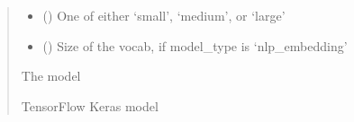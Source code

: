 \documentclass[letterpaper,10pt,english]{sphinxmanual}
\begin{document}
\begin{fulllineitems}
\begin{quote}
\begin{description}
\begin{itemize}
\item {} 
\sphinxAtStartPar
{} (\sphinxstyleliteralemphasis{\sphinxupquote{ (}}\sphinxstyleliteralemphasis{\sphinxupquote{)}}) \textendash{} One of either ‘small’, ‘medium’, or ‘large’

\item {} 
\sphinxAtStartPar
{} (\sphinxstyleliteralemphasis{\sphinxupquote{ (}}\sphinxstyleliteralemphasis{\sphinxupquote{)}}) \textendash{} Size of the vocab, if model\_type is ‘nlp\_embedding’

\end{itemize}

\sphinxAtStartPar
{} \textendash{} The model

\sphinxAtStartPar
TensorFlow Keras model

\end{description}\end{quote}

\end{fulllineitems}

\end{document}
